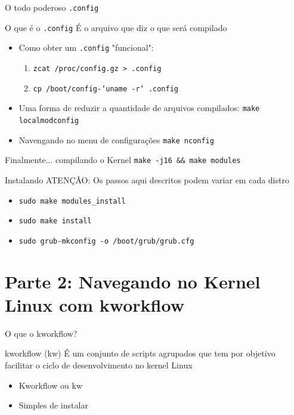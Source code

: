 \documentclass[10pt, compress, aspectratio=169]{beamer}
\begin{document}
\begin{frame}{O todo poderoso \texttt{.config}}

 \begin{exampleblock}{O que é o \texttt{.config}}
  É o arquivo que diz o que será compilado
 \end{exampleblock}

  \begin{itemize}
    \item Como obter um \texttt{.config} "funcional":
      \begin{enumerate}
        \item \texttt{zcat /proc/config.gz > .config}
        \item \texttt{cp /boot/config-`uname -r` .config}
      \end{enumerate}
    \item Uma forma de reduzir a quantidade de arquivos compilados: \newline
      \texttt{make localmodconfig}
    \item Navengando no menu de configurações \newline
      \texttt{make nconfig}
  \end{itemize}
\end{frame}

\begin{frame}{Finalmente... compilando o Kernel}
  \texttt{make -j16 \&\& make modules}
\end{frame}

\begin{frame}{Instalando}
  ATENÇÃO: Os passos aqui descritos podem variar em cada distro
  \begin{itemize}
    \item \texttt{sudo make modules\_install}
    \item \texttt{sudo make install}
    \item \texttt{sudo grub-mkconfig -o /boot/grub/grub.cfg}
  \end{itemize}
\end{frame}

\section{Parte 2: Navegando no Kernel Linux com kworkflow}

\begin{frame}{O que o kworkflow?}
 \begin{exampleblock}{kworkflow (kw)}
  É um conjunto de scripts agrupados que tem por objetivo facilitar o
  ciclo de desenvolvimento no kernel Linux
 \end{exampleblock}
  \begin{itemize}
    \item Kworkflow ou kw
    \item Simples de instalar
  \end{itemize}
\end{frame}
\end{document}
